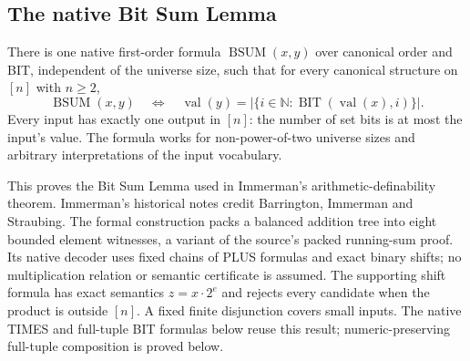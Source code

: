 \begin{result}
\subsection{The native Bit Sum Lemma}
There is one native first-order formula $\operatorname{BSUM}(x,y)$ over
canonical order and BIT, independent of the universe size, such that for every
canonical structure on $[n]$ with $n\ge2$,
\[
\operatorname{BSUM}(x,y)\quad\Longleftrightarrow\quad
\operatorname{val}(y)
=\bigl|\{i\in\mathbb N : \operatorname{BIT}(\operatorname{val}(x),i)\}\bigr|.
\]
Every input has exactly one output in $[n]$: the number of set bits is at most
the input's value. The formula works for non-power-of-two universe sizes and
arbitrary interpretations of the input vocabulary.

This proves the Bit Sum Lemma used in Immerman's arithmetic-definability
theorem.\citep[Lemma 1.18 and Theorem 1.17(1)]{Immerman1999}
Immerman's historical notes credit Barrington, Immerman and
Straubing.\citep{BarringtonImmermanStraubing1990}
The formal construction packs a balanced addition tree into eight bounded
element witnesses, a variant of the source's packed running-sum proof. Its
native decoder uses fixed chains of PLUS formulas and exact binary shifts;
no multiplication relation or semantic certificate is assumed. The supporting
shift formula has exact semantics $z=x\cdot2^e$ and rejects every candidate
when the product is outside $[n]$. A fixed finite disjunction covers small
inputs. The native TIMES and full-tuple BIT formulas below reuse this result;
numeric-preserving full-tuple composition is proved below.
\end{result}


